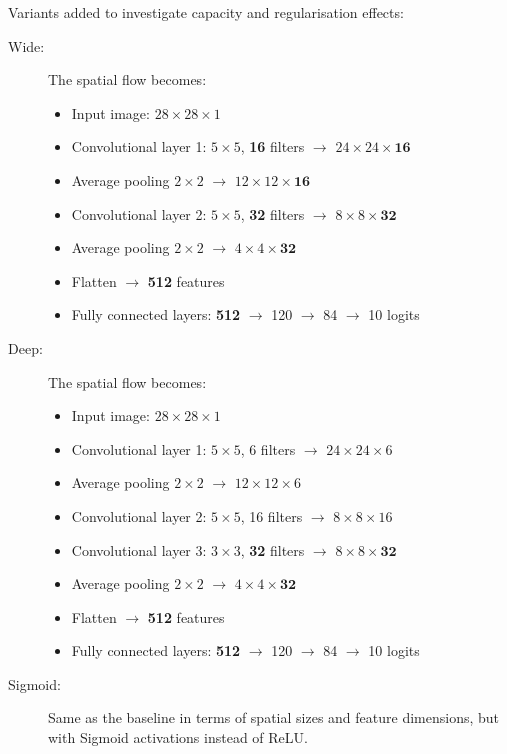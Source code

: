 Variants added to investigate capacity and regularisation effects:
\begin{description}
  \item[Wide:]
  The spatial flow becomes:
  \begin{itemize}
    \item Input image: $28\times28\times1$
    \item Convolutional layer 1: $5\times5$, \textbf{16} filters $\rightarrow$ $24\times24\times\textbf{16}$
    \item Average pooling $2\times2$ $\rightarrow$ $12\times12\times\textbf{16}$
    \item Convolutional layer 2: $5\times5$, \textbf{32} filters $\rightarrow$ $8\times8\times\textbf{32}$
    \item Average pooling $2\times2$ $\rightarrow$ $4\times4\times\textbf{32}$
    \item Flatten $\rightarrow$ \textbf{512} features
    \item Fully connected layers: \textbf{512} $\rightarrow$ 120 $\rightarrow$ 84 $\rightarrow$ 10 logits
  \end{itemize}
  \item[Deep:]
  The spatial flow becomes:
  \begin{itemize}
    \item Input image: $28\times28\times1$
    \item Convolutional layer 1: $5\times5$, 6 filters $\rightarrow$ $24\times24\times6$
    \item Average pooling $2\times2$ $\rightarrow$ $12\times12\times6$
    \item Convolutional layer 2: $5\times5$, 16 filters $\rightarrow$ $8\times8\times16$
    \item Convolutional layer 3: $3\times3$, \textbf{32} filters $\rightarrow$ $8\times8\times\textbf{32}$
    \item Average pooling $2\times2$ $\rightarrow$ $4\times4\times\textbf{32}$
    \item Flatten $\rightarrow$ \textbf{512} features
    \item Fully connected layers: \textbf{512} $\rightarrow$ 120 $\rightarrow$ 84 $\rightarrow$ 10 logits
  \end{itemize}
  \item[Sigmoid:]
  Same as the baseline in terms of spatial sizes and feature dimensions, but with Sigmoid activations instead of ReLU.
\end{description}

